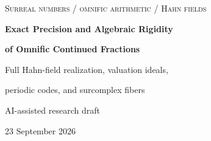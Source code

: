 \documentclass[11pt,a4paper]{article}
\numberwithin{equation}{section}
\theoremstyle{definition}
\theoremstyle{remark}
\newcommand{\dgr}{\operatorname{deg}}
\begin{document}
\hypersetup{pageanchor=false}
\begin{titlepage}
\centering
\vspace*{12mm}
{\small\scshape Surreal numbers \; / \; omnific arithmetic \; / \; Hahn fields\par}
\vspace{12mm}
{\LARGE\bfseries Exact Precision and Algebraic Rigidity\par}
\vspace{3mm}
{\LARGE\bfseries of Omnific Continued Fractions\par}
\vspace{7mm}
{\large Full Hahn-field realization, valuation ideals,\par
periodic codes, and surcomplex fibers\par}
\vspace{10mm}
{AI-assisted research draft\par}
{23 September 2026\par}
\vspace{10mm}
\begin{minipage}{0.93\textwidth}
\begin{abstract}
An ordinary infinite continued fraction with omnific integer digits does not
usually determine one surreal number. Its indeterminacy was already studied
by Roggeman. We give a valuation-theoretic refinement and use it to derive
precise realization and algebraicity criteria. If $q_n$ are the continuant
denominators and $d_n=\dgr q_n$, the complete fiber of a digit sequence is
exactly a translate of the ideal of errors $\epsilon$ satisfying
$v(\epsilon)>2d_n$ for every ordinary $n$. A uniform two-step buffer estimate
makes this description independent of the chosen realization.


\end{abstract}
\end{minipage}
\end{titlepage}
\end{document}
